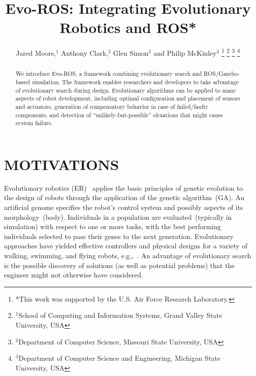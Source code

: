 \documentclass[letterpaper, 10 pt, journal]{ieeeconf}  %
\title{\LARGE \bf
Evo-ROS: Integrating Evolutionary Robotics and ROS*
}
\author{Jared Moore,$^{1}$ Anthony Clark,$^{2}$ Glen Simon$^{3}$ and Philip McKinley$^{3}$%
\thanks{*This work was supported by the U.S. Air Force Research Laboratory.}%
\thanks{$^{1}$School of Computing and Information Systems, Grand Valley State University, USA}
\thanks{$^{2}$Department of Computer Science, Missouri State University, USA}
\thanks{$^{3}$Department of Computer Science and Engineering, Michigan State University, USA}
}
\begin{document}
\newcommand{\project}{Evo-ROS}


\maketitle

\thispagestyle{empty}
\pagestyle{empty}


\begin{abstract}

We introduce Evo-ROS, a framework combining evolutionary search
and ROS/Gazebo-based simulation. The framework 
enables researchers and developers to take
advantage of evolutionary search during design. 
Evolutionary algorithms can be applied to many aspects of 
robot development,
including optimal configuration and placement of sensors and
actuators, generation of compensatory behavior in case of
failed/faulty components, and detection of
“unlikely-but-possible” situations that might cause system failure.  
\end{abstract}


\vspace{-0.1in}
\section{MOTIVATIONS}

Evolutionary robotics (ER)~\cite{Floreano2008} applies the basic principles of genetic evolution to the design of robots through the application of the genetic algorithm~(GA).
%
An artificial genome specifies the robot's control system and possibly aspects of its morphology~(body).
%
Individuals in a population are evaluated~(typically in simulation) with respect to one or more tasks, with the best performing individuals selected to pass their genes to the next generation.
%
Evolutionary approaches have yielded effective controllers and physical designs for a variety of 
walking, swimming, and flying robots, e.g.,~\cite{Floreano2008,Clark.JournalBB.2015,MooreALIFEJournal}.
%
%
An advantage of evolutionary search is the possible discovery of solutions (as well as potential problems) that the engineer might not otherwise have considered.
\end{document}
